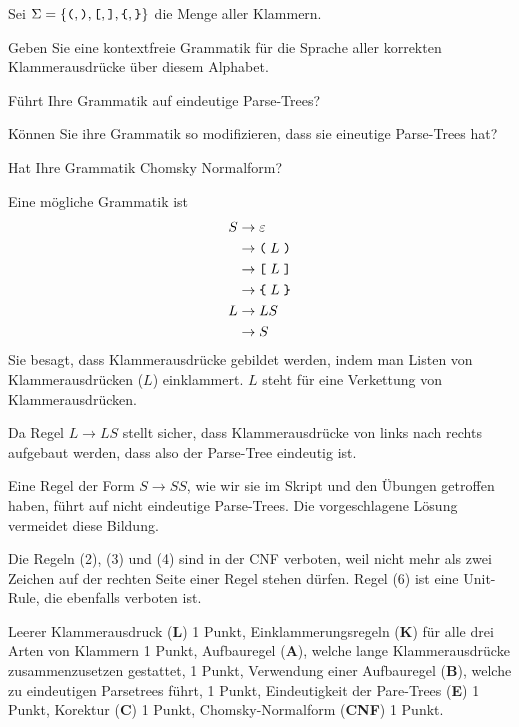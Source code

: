 Sei $\Sigma=\{
\texttt{(},
\texttt{)},
\texttt{[},
\texttt{]},
\verb+{+,
\verb+}+
\}$
die Menge aller Klammern.
\begin{teilaufgaben}
\item
Geben Sie eine kontextfreie Grammatik für die Sprache aller korrekten
Klammerausdrücke über diesem Alphabet.
\item
Führt Ihre Grammatik auf eindeutige Parse-Trees?
\item
Können Sie ihre Grammatik so modifizieren, dass sie eineutige Parse-Trees hat?
\item
Hat Ihre Grammatik Chomsky Normalform?
\end{teilaufgaben}

\begin{loesung}
\begin{teilaufgaben}
\item
Eine mögliche Grammatik ist
\begin{align}
S&\rightarrow \varepsilon 
\\
 &\rightarrow \texttt{(} \; L \; \texttt{)}
\\
 &\rightarrow \texttt{[} \; L \; \texttt{]}
\\
 &\rightarrow \texttt{\char`\{} \; L \; \texttt{\char`\}}
\\
L&\rightarrow LS
\\
 &\rightarrow S
\end{align}
Sie besagt, dass Klammerausdrücke gebildet werden, indem man Listen
von Klammerausdrücken ($L$) einklammert.
$L$ steht für eine Verkettung von Klammerausdrücken.
\item
Da Regel $L\rightarrow LS$ stellt sicher, dass Klammerausdrücke von links
nach rechts aufgebaut werden, dass also der Parse-Tree eindeutig ist.
\item
Eine Regel der Form $S\rightarrow SS$, wie wir sie im Skript und den
Übungen getroffen haben, führt auf nicht eindeutige Parse-Trees.
Die vorgeschlagene Lösung vermeidet diese Bildung.
\item
Die Regeln 
(2), (3) und (4) sind in der CNF verboten, weil nicht mehr als zwei
Zeichen auf der rechten Seite einer Regel stehen dürfen.
Regel (6) ist eine Unit-Rule, die ebenfalls verboten ist.
\qedhere
\end{teilaufgaben}
\end{loesung}

\begin{bewertung}
Leerer Klammerausdruck ({\bf L}) 1 Punkt,
Einklammerungsregeln ({\bf K}) für alle drei Arten von Klammern 1 Punkt,
Aufbauregel ({\bf A}), welche lange Klammerausdrücke zusammenzusetzen
gestattet, 1 Punkt,
Verwendung einer Aufbauregel ({\bf B}), welche zu eindeutigen Parsetrees führt,
1 Punkt,
Eindeutigkeit der Pare-Trees ({\bf E}) 1 Punkt,
Korektur ({\bf C}) 1 Punkt,
Chomsky-Normalform ({\bf CNF}) 1 Punkt.
\end{bewertung}


